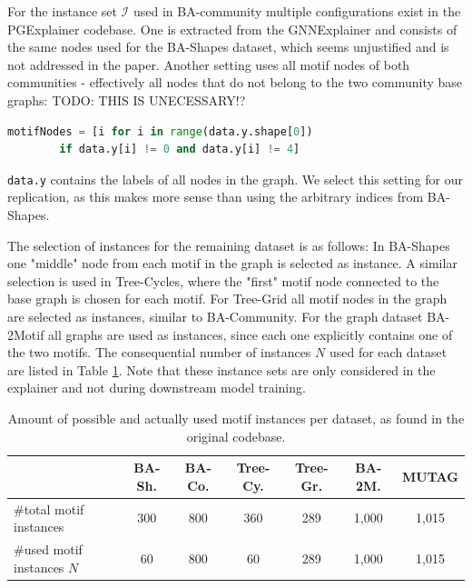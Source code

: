 For the instance set $\mathcal{I}$ used in BA-community multiple configurations exist in the PGExplainer codebase. One is extracted from the GNNExplainer \cite{ying2019gnnexplainer} and consists of the same nodes used for the BA-Shapes dataset, which seems unjustified and is not addressed in the paper. Another setting uses all motif nodes of both communities - effectively all nodes that do not belong to the two community base graphs:
TODO: THIS IS UNECESSARY!?
\begin{lstlisting}[language=Python, caption=Selection of BA-Community instances, label=lst:community_nodes]
    motifNodes = [i for i in range(data.y.shape[0]) 
        if data.y[i] != 0 and data.y[i] != 4]
\end{lstlisting}
\lstinline|data.y| contains the labels of all nodes in the graph.
We select this setting for our replication, as this makes more sense than using the arbitrary indices from BA-Shapes. \bigskip

The selection of instances for the remaining dataset is as follows: In BA-Shapes one "middle" node from each motif in the graph is selected as instance. A similar selection is used in Tree-Cycles, where the "first" motif node connected to the base graph is chosen for each motif. For Tree-Grid all motif nodes in the graph are selected as instances, similar to BA-Community. For the graph dataset BA-2Motif all graphs are used as instances, since each one explicitly contains one of the two motifs. The consequential number of instances $N$ used for each dataset are listed in Table \ref{tab:motif-statistics}. Note that these instance sets are only considered in the explainer and not during downstream model training.

\begin{table}[h]
    \centering
    \scriptsize
    \begin{tabular}{l|cccc|cc}
    \hline
    \textbf{} & \textbf{BA-Sh.} & \textbf{BA-Co.} & \textbf{Tree-Cy.} & \textbf{Tree-Gr.} & \textbf{BA-2M.} & \textbf{MUTAG} \\
    \hline
    \#total motif instances & 300 & 800 & 360 & 289 & 1,000 & 1,015 \\
    \#used motif instances $N$ & 60 & 800 & 60 & 289 & 1,000 & 1,015 \\
    \hline
    \end{tabular}
    \caption[Statistics of motif instances per dataset]{Amount of possible and actually used motif instances per dataset, as found in the original codebase.}
    \label{tab:motif-statistics}
\end{table}



